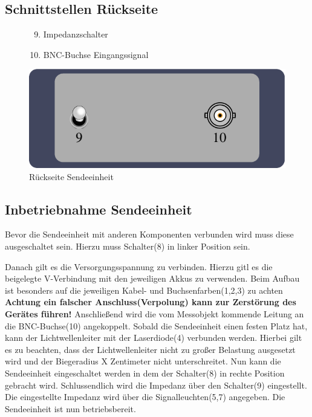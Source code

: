 \documentclass[10pt,a4paper]{scrartcl}
\begin{document}
\subsection{Schnittstellen Rückseite}
\begin{figure}[H]
\begin{minipage}[t]{6cm}
\vspace{0pt}
\centering
\begin{enumerate}
\setcounter{enumi}{8}
\item Impedanzschalter
\item BNC-Buchse Eingangssignal
\end{enumerate}
\end{minipage}
\hfill
\begin{minipage}[t]{6.5cm}
\vspace{0pt}
\includegraphics[scale=0.7]{gfx/tx-back.pdf}
\caption{Rückseite Sendeeinheit}
\label{fig:tx-back}
\end{minipage}
\end{figure}

\subsection{Inbetriebnahme Sendeeinheit}
Bevor die Sendeeinheit mit anderen Komponenten verbunden wird muss diese ausgeschaltet sein. Hierzu muss Schalter(8) in linker Position sein.

Danach gilt es die Versorgungsspannung zu verbinden. Hierzu gitl es die beigelegte V-Verbindung mit den jeweiligen Akkus zu verwenden. Beim Aufbau ist besonders auf die jeweiligen Kabel- und Buchsenfarben(1,2,3) zu achten \textbf{Achtung ein falscher Anschluss(Verpolung) kann zur Zerstörung des Gerätes führen!}
Anschließend wird die vom Messobjekt kommende Leitung an die BNC-Buchse(10) angekoppelt.
Sobald die Sendeeinheit einen festen Platz hat, kann der Lichtwellenleiter mit der Laserdiode(4) verbunden werden. Hierbei gilt es zu beachten, dass der Lichtwellenleiter nicht zu großer Belastung ausgesetzt wird und der Biegeradius X Zentimeter nicht unterschreitet.
Nun kann die Sendeeinheit eingeschaltet werden in dem der Schalter(8) in rechte Position gebracht wird. Schlussendlich wird die Impedanz über den Schalter(9) eingestellt. Die eingestellte Impedanz wird über die Signalleuchten(5,7) angegeben.
Die Sendeeinheit ist nun betriebsbereit. 
\end{document}
